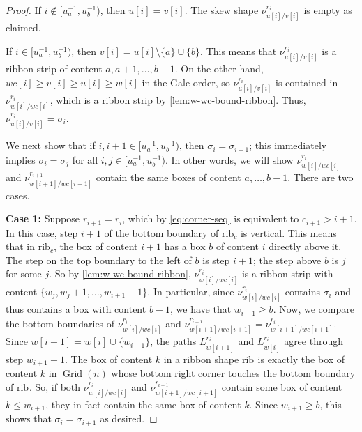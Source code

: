 \documentclass[11pt]{amsart}
\theoremstyle{definition}
\DeclareMathOperator{\Grid}{Grid}
\def\rib_#1{\mathrm{rib}_{#1}}
\def\grid_#1{\Grid(#1)}
\def\path{L}
\def\skew{\nu}
\begin{document}
\begin{proof}
	If $i \notin [u^{-1}_a, u^{-1}_b)$, then $u[i]=v[i]$. The skew shape $\skew_{u[i]/v[i]}^{r_i}$ is empty as claimed.
	
	If $i \in [u^{-1}_a, u^{-1}_b)$, then $v[i]=u[i] \setminus \{a\} \cup \{b\}$. This means that $\skew_{u[i]/v[i]}^{r_i}$ is a ribbon strip of content $a, a+1, \dots, b-1$. On the other hand, $wc[i] \geq v[i] \geq u[i] \geq w[i]$ in the Gale order, so $\skew_{u[i]/v[i]}^{r_i}$ is contained in $\skew_{w[i]/wc[i]}^{r_i}$, which is a ribbon strip by \cref{lem:w-wc-bound-ribbon}. Thus, $\skew_{u[i]/v[i]}^{r_i}= \sigma_i$. 
	
	We next show that if $i, i+1\in [u^{-1}_a, u^{-1}_b)$, then $\sigma_i=\sigma_{i+1}$; this immediately implies $\sigma_i=\sigma_{j}$ for all $i, j  \in [u^{-1}_a, u^{-1}_b)$. In other words, we will show $\skew_{w[i]/wc[i]}^{r_i}$ and $\skew_{w[i+1]/wc[i+1]}^{r_{i+1}}$ contain the same boxes of content $a, \dots, b-1$. There are two cases. 
	
	\noindent \textbf{Case 1:} Suppose $r_{i+1}= r_i$, which by \eqref{eq:corner-seq} is equivalent to $c_{i+1}>i+1$. In this case, step $i+1$ of the bottom boundary of $\rib_c$ is vertical. This means that in $\rib_c$, the box of content $i+1$ has a box $b$ of content $i$ directly above it.  
	The step on the top boundary to the left of $b$ is step $i+1$; the step above $b$ is $j$ for some $j$. So by \cref{lem:w-wc-bound-ribbon}, $\skew_{w[i]/wc[i]}^{r_i}$ is a ribbon strip with content $\{w_j, w_j+1, \dots, w_{i+1}-1\}$.
	In particular, since $\skew_{w[i]/wc[i]}^{r_i}$ contains $\sigma_i$ and thus contains a box with content $b-1$, we have that $w_{i+1} \geq b$. Now, we compare the bottom boundaries of $\skew_{w[i]/wc[i]}^{r_i}$ and $\skew_{w[i+1]/wc[i+1]}^{r_{i+1}}=\skew_{w[i+1]/wc[i+1]}^{r_{i}}$. Since $w[i+1]=w[i] \cup \{w_{i+1}\}$, the paths $\path_{w[i+1]}^{r_i}$ and $\path_{w[i]}^{r_i}$ agree through step $w_{i+1}-1$. The box of content $k$ in a ribbon shape $\rib_{}$ is exactly the box of content $k$ in $\grid_n$ whose bottom right corner touches the bottom boundary of $\rib_{}$. So, if both $\skew_{w[i]/wc[i]}^{r_i}$ and $\skew_{w[i+1]/wc[i+1]}^{r_{i+1}}$ contain some box of content $k \leq w_{i+1}$, they in fact contain the same box of content $k$. Since $w_{i+1}\ge b$, this shows that $\sigma_i=\sigma_{i+1}$ as desired.
	

\end{proof}
\end{document}
